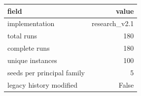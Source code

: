 \begin{tabular}{lr}
\toprule
field & value \\
\midrule
implementation & research\_v2.1 \\
total runs & 180 \\
complete runs & 180 \\
unique instances & 100 \\
seeds per principal family & 5 \\
legacy history modified & False \\
\bottomrule
\end{tabular}